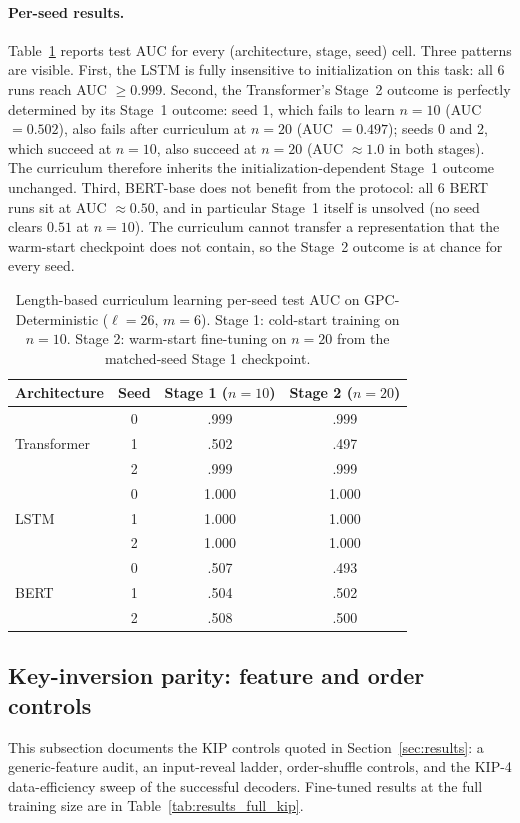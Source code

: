 \documentclass{article} %
\theoremstyle{plain}
\theoremstyle{definition}
\theoremstyle{remark}
\begin{document}
\paragraph{Per-seed results.} Table~\ref{tab:curriculum-per-seed} reports test AUC for every (architecture, stage, seed) cell. Three patterns are visible. First, the LSTM is fully insensitive to initialization on this task: all 6 runs reach AUC $\geq 0.999$. Second, the Transformer's Stage~2 outcome is perfectly determined by its Stage~1 outcome: seed 1, which fails to learn $n=10$ (AUC $=0.502$), also fails after curriculum at $n=20$ (AUC $=0.497$); seeds 0 and 2, which succeed at $n=10$, also succeed at $n=20$ (AUC $\approx 1.0$ in both stages). The curriculum therefore inherits the initialization-dependent Stage~1 outcome unchanged. Third, BERT-base does not benefit from the protocol: all 6 BERT runs sit at AUC $\approx 0.50$, and in particular Stage~1 itself is unsolved (no seed clears $0.51$ at $n=10$). The curriculum cannot transfer a representation that the warm-start checkpoint does not contain, so the Stage~2 outcome is at chance for every seed.

\begin{table}[h]
\caption{Length-based curriculum learning per-seed test AUC on GPC-Deterministic ($\ell=26$, $m=6$). Stage 1: cold-start training on $n=10$. Stage 2: warm-start fine-tuning on $n=20$ from the matched-seed Stage 1 checkpoint.}
\label{tab:curriculum-per-seed}
\centering
\begin{tabular}{lccc}
\toprule
Architecture & Seed & Stage 1 ($n{=}10$) & Stage 2 ($n{=}20$) \\
\midrule
\multirow{3}{*}{Transformer} & 0 & .999 & .999 \\
 & 1 & .502 & .497 \\
 & 2 & .999 & .999 \\
\midrule
\multirow{3}{*}{LSTM} & 0 & 1.000 & 1.000 \\
 & 1 & 1.000 & 1.000 \\
 & 2 & 1.000 & 1.000 \\
\midrule
\multirow{3}{*}{BERT} & 0 & .507 & .493 \\
 & 1 & .504 & .502 \\
 & 2 & .508 & .500 \\
\bottomrule
\end{tabular}
\end{table}

\subsection{Key-inversion parity: feature and order controls}
\label{app:kip_controls}
This subsection documents the KIP controls quoted in Section~\ref{sec:results}: a generic-feature audit, an input-reveal ladder, order-shuffle controls, and the KIP-4 data-efficiency sweep of the successful decoders. Fine-tuned results at the full training size are in Table~\ref{tab:results_full_kip}.
\end{document}

